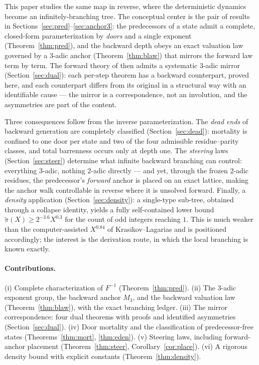 \documentclass[11pt]{article}
\theoremstyle{remark}
\begin{document}
This paper studies the same map in reverse, where the deterministic dynamics become an infinitely-branching tree. The conceptual center is the pair of results in Sections~\ref{sec:pred}--\ref{sec:anchor3}: the predecessors of a state admit a complete, closed-form parameterization by \emph{doors} and a single exponent (Theorem~\ref{thm:pred}), and the backward depth obeys an exact valuation law governed by a $3$-adic anchor (Theorem~\ref{thm:blaw}) that mirrors the forward law term by term. The forward theory of \cite{paper1} then admits a systematic $3$-adic mirror (Section~\ref{sec:dual}): each per-step theorem has a backward counterpart, proved here, and each counterpart differs from its original in a structural way with an identifiable cause --- the mirror is a correspondence, not an involution, and the asymmetries are part of the content.

Three consequences follow from the inverse parameterization. The \emph{dead ends} of backward generation are completely classified (Section~\ref{sec:dead}): mortality is confined to one door per state and two of the four admissible residue--parity classes, and total barrenness occurs only at depth one. The \emph{steering} laws (Section~\ref{sec:steer}) determine what infinite backward branching can control: everything $3$-adic, nothing $2$-adic directly --- and yet, through the frozen $2$-adic residues, the predecessor's \emph{forward} anchor is placed on an exact lattice, making the anchor walk controllable in reverse where it is unsolved forward. Finally, a \emph{density} application (Section~\ref{sec:density}): a single-type sub-tree, obtained through a collapse identity, yields a fully self-contained lower bound $\tilde\pi(X) \ge 2^{-3.6}X^{0.3}$ for the count of odd integers reaching $1$. This is much weaker than the computer-assisted $X^{0.84}$ of Krasikov--Lagarias \cite{kl} and is positioned accordingly; the interest is the derivation route, in which the local branching is known exactly.

\paragraph{Contributions.} (i) Complete characterization of $F^{-1}$ (Theorem~\ref{thm:pred}). (ii) The $3$-adic exponent group, the backward anchor $M_3$, and the backward valuation law (Theorem~\ref{thm:blaw}), with the exact branching ledger. (iii) The mirror correspondence: four dual theorems with proofs and identified asymmetries (Section~\ref{sec:dual}). (iv) Door mortality and the classification of predecessor-free states (Theorems~\ref{thm:mort}, \ref{thm:eden}). (v) Steering laws, including forward-anchor placement (Theorem~\ref{thm:steer}, Corollary~\ref{cor:place}). (vi) A rigorous density bound with explicit constants (Theorem~\ref{thm:density}).
\end{document}
